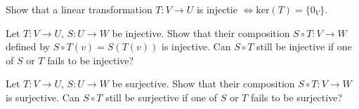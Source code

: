 \exercises
\begin{exerciselist}
	\item Show that a linear transformation $T:V\to U$ is injectie $\iff \textrm{ker}(T)=\{0_V\}$.
	\item Let $T:V\to U$, $S:U\to W$ be injective. Show that their composition $S\circ T: V\to W$ defined by $S\circ T(v)= S(T(v))$ is injective. Can $S\circ T$ still be injective if one of $S$ or $T$ fails to be injective?
	\item Let $T:V\to U$, $S:U\to W$ be surjective. Show that their composition $S\circ T: V\to W$ is surjective. Can $S\circ T$ still be surjective if one of $S$ or $T$ fails to be surjective?
\end{exerciselist}